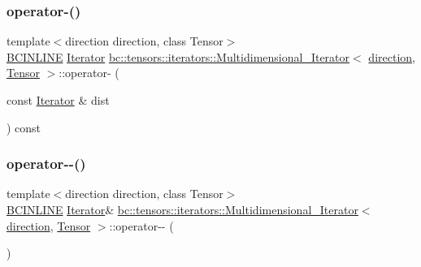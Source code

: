 \subsubsection{\texorpdfstring{operator-\/()}{operator-()}\hspace{0.1cm}{\footnotesize\ttfamily [2/2]}}
{\footnotesize\ttfamily template$<$direction direction, class Tensor$>$ \\
\hyperlink{common_8h_a6699e8b0449da5c0fafb878e59c1d4b1}{B\+C\+I\+N\+L\+I\+NE} \hyperlink{structbc_1_1tensors_1_1iterators_1_1Multidimensional__Iterator_a12d78eb95b3b0fbee7c824f0a79c1513}{Iterator} \hyperlink{structbc_1_1tensors_1_1iterators_1_1Multidimensional__Iterator}{bc\+::tensors\+::iterators\+::\+Multidimensional\+\_\+\+Iterator}$<$ \hyperlink{namespacebc_1_1tensors_1_1iterators_ae76efe63fb9cb4985d5e4e6af0ebf296}{direction}, \hyperlink{namespacebc_a659391e47ab612be3ba6c18cf9c89159}{Tensor} $>$\+::operator-\/ (\begin{DoxyParamCaption}\item[{const \hyperlink{structbc_1_1tensors_1_1iterators_1_1Multidimensional__Iterator_a12d78eb95b3b0fbee7c824f0a79c1513}{Iterator} \&}]{dist }\end{DoxyParamCaption}) const\hspace{0.3cm}{\ttfamily [inline]}}

\mbox{\label{structbc_1_1tensors_1_1iterators_1_1Multidimensional__Iterator_ac92f227fcbb037ab120156a3bdc327bc}} 
\subsubsection{\texorpdfstring{operator-\/-\/()}{operator--()}\hspace{0.1cm}{\footnotesize\ttfamily [1/2]}}
{\footnotesize\ttfamily template$<$direction direction, class Tensor$>$ \\
\hyperlink{common_8h_a6699e8b0449da5c0fafb878e59c1d4b1}{B\+C\+I\+N\+L\+I\+NE} \hyperlink{structbc_1_1tensors_1_1iterators_1_1Multidimensional__Iterator_a12d78eb95b3b0fbee7c824f0a79c1513}{Iterator}\& \hyperlink{structbc_1_1tensors_1_1iterators_1_1Multidimensional__Iterator}{bc\+::tensors\+::iterators\+::\+Multidimensional\+\_\+\+Iterator}$<$ \hyperlink{namespacebc_1_1tensors_1_1iterators_ae76efe63fb9cb4985d5e4e6af0ebf296}{direction}, \hyperlink{namespacebc_a659391e47ab612be3ba6c18cf9c89159}{Tensor} $>$\+::operator-\/-\/ (\begin{DoxyParamCaption}{ }\end{DoxyParamCaption})\hspace{0.3cm}{\ttfamily [inline]}}

